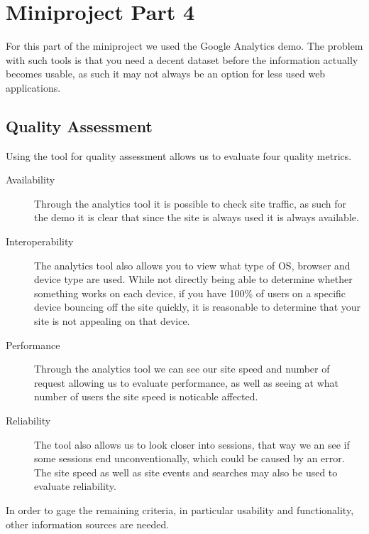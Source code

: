 \chapter{Miniproject Part 4}
For this part of the miniproject we used the Google Analytics demo.
The problem with such tools is that you need a decent dataset before the information actually becomes usable, as such it may not always be an option for less used web applications.

\section{Quality Assessment}
Using the tool for quality assessment allows us to evaluate four quality metrics.
\begin{description}
	\item [Availability] Through the analytics tool it is possible to check site traffic, as such for the demo it is clear that since the site is always used it is always available. 
	\item [Interoperability] The analytics tool also allows you to view what type of  OS, browser and device type are used.
	While not directly being able to determine whether something works on each device, if you have 100\% of users on a specific device bouncing off the site quickly, it is reasonable to determine that your site is not appealing on that device.
	\item [Performance] Through the analytics tool we can see our site speed and number of request allowing us to evaluate performance, as well as seeing at what number of users the site speed is noticable affected.
	\item [Reliability] The tool also allows us to look closer into sessions, that way we an see if some sessions end unconventionally, which could be caused by an error. The site speed as well as site events and searches may also be used to evaluate reliability.
\end{description}

In order to gage the remaining criteria, in particular usability and functionality, other information sources are needed.

